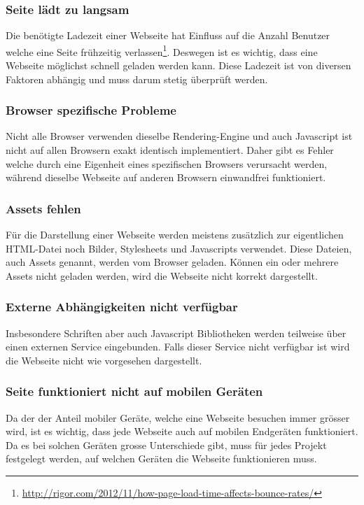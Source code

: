 \subsubsection{Seite lädt zu langsam}
\label{ssub:seite_lädt_zu_langsam}
Die benötigte Ladezeit einer Webseite hat Einfluss auf die Anzahl Benutzer welche eine Seite frühzeitig verlassen\footnote{\url{http://rigor.com/2012/11/how-page-load-time-affects-bounce-rates/}}. Deswegen ist es wichtig, dass eine Webseite möglichst schnell geladen werden kann. Diese Ladezeit ist von diversen Faktoren abhängig und muss darum stetig überprüft werden.

\subsubsection{Browser spezifische Probleme}
\label{ssub:browserspezifischeprobleme}
Nicht alle Browser verwenden dieselbe Rendering-Engine und auch Javascript ist nicht auf allen Browsern exakt identisch implementiert. Daher gibt es Fehler welche durch eine Eigenheit eines spezifischen Browsers verursacht werden, während dieselbe Webseite auf anderen Browsern einwandfrei funktioniert.

\subsubsection{Assets fehlen}
\label{ssub:assetsfehlen}
Für die Darstellung einer Webseite werden meistens zusätzlich zur eigentlichen HTML-Datei noch Bilder, Stylesheets und Javascripts verwendet. Diese Dateien, auch Assets genannt, werden vom Browser geladen. Können ein oder mehrere Assets nicht geladen werden, wird die Webseite nicht korrekt dargestellt.

\subsubsection{Externe Abhängigkeiten nicht verfügbar}
\label{ssub:externeabhaengigkeiten_nicht_verfügbar}
Insbesondere Schriften aber auch Javascript Bibliotheken werden teilweise über einen externen Service eingebunden. Falls dieser Service nicht verfügbar ist wird die Webseite nicht wie vorgesehen dargestellt.

\subsubsection{Seite funktioniert nicht auf mobilen Geräten}
\label{ssub:seitefunktioniertnichtaufmobilengeraeten}
Da der der Anteil mobiler Geräte, welche eine Webseite besuchen immer grösser wird, ist es wichtig, dass jede Webseite auch auf mobilen Endgeräten funktioniert. Da es bei solchen Geräten grosse Unterschiede gibt, muss für jedes Projekt festgelegt werden, auf welchen Geräten die Webseite funktionieren muss.


